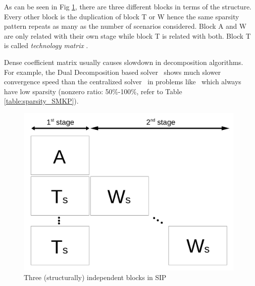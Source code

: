 

As can be seen in Fig \ref{fig:stagewise_sparsity}, there are three different blocks in terms of the structure. Every other block is the duplication of block T or W hence the same sparsity pattern repeats as many as the number of scenarios considered. Block A and W are only related with their own stage while block T is related with both. Block T is called \textit{technology matrix} . 

Dense coefficient matrix usually causes slowdown in decomposition algorithms. For example, the Dual Decomposition based solver \dsp\ shows much slower convergence speed than the centralized solver \cplex\ in problems like \smkp\ which always have low sparsity (nonzero ratio: 50\%-100\%, refer to Table \ref{table:sparsity_SMKP}).
\begin{figure}
	\centering
	\includegraphics[width=0.7\linewidth]{drawings/stagewise_sparsity}
	\caption{Three (structurally) independent blocks in SIP}
	\label{fig:stagewise_sparsity}
\end{figure}









